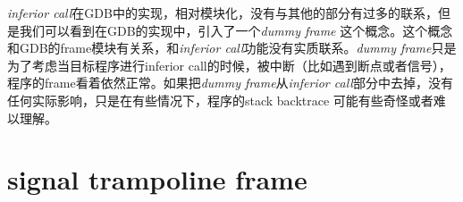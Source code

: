\textit{inferior call}在GDB中的实现，相对模块化，没有与其他的部分有过多的联系，但是我们可以看到在GDB的实现中，引入了一个\textit{dummy frame}
这个概念。这个概念和GDB的frame模块有关系，和\textit{inferior call}功能没有实质联系。\textit{dummy frame}只是为了考虑当目标程序进行inferior call的时候，被中断（比如遇到断点或者信号），程序的frame看着依然正常。如果把\textit{dummy frame}从\textit{inferior call}部分中去掉，没有任何实际影响，只是在有些情况下，程序的stack backtrace 可能有些奇怪或者难以理解。

\section{signal trampoline frame}